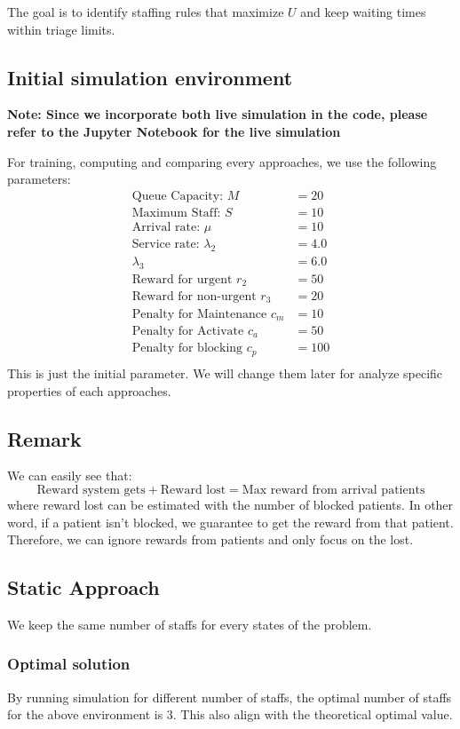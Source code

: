 \documentclass{article}
\begin{document}
The goal is to identify staffing rules that maximize $U$ and keep waiting times within triage limits.

\subsection*{Initial simulation environment}
\textbf{Note: Since we incorporate both live simulation in the code, please refer to the Jupyter Notebook for the live simulation }

For training, computing and comparing every approaches, we use the following parameters:
\begin{align*}
    \text{Queue Capacity: } M &= 20\\
    \text{Maximum Staff: } S &= 10\\
    \text{Arrival rate: } \mu &= 10\\
    \text{Service rate: } \lambda_2 &= 4.0\\
    \lambda_3 &= 6.0\\
    \text{Reward for urgent } r_2 &= 50\\
    \text{Reward for non-urgent } r_3 &= 20\\
    \text{Penalty for Maintenance } c_m &= 10\\
    \text{Penalty for Activate } c_a &= 50\\
    \text{Penalty for blocking } c_p &= 100\\
\end{align*}
This is just the initial parameter. We will change them later for analyze specific properties of each approaches.

\subsection*{Remark}
We can easily see that:
\[\text{Reward system gets} + \text{Reward lost} = \text{Max reward from arrival patients}\]
where reward lost can be estimated with the number of blocked patients. In other word, 
if a patient isn't blocked, we guarantee to get the reward from that patient. Therefore,
we can ignore rewards from patients and only focus on the lost.


\subsection*{Static Approach}
We keep the same number of staffs for every states of the problem.
\subsubsection*{Optimal solution}
By running simulation for different number of staffs, the optimal number
of staffs for the above environment is 3. This also align with the theoretical optimal
value.
\end{document}
